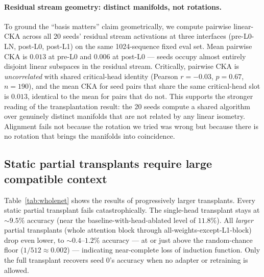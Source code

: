 \documentclass[final]{article}
\begin{document}
\paragraph{Residual stream geometry: distinct manifolds, not rotations.}
To ground the ``basis matters'' claim geometrically, we compute pairwise
linear-CKA across all 20 seeds' residual stream activations at three
interfaces (pre-L0-LN, post-L0, post-L1) on the same 1024-sequence fixed eval
set. Mean pairwise CKA is $0.013$ at pre-L0 and $0.006$ at post-L0 --- seeds
occupy almost entirely disjoint linear subspaces in the residual stream.
Critically, pairwise CKA is \emph{uncorrelated} with shared critical-head
identity (Pearson $r=-0.03$, $p=0.67$, $n=190$), and the mean CKA for seed
pairs that share the same critical-head slot is $0.013$, identical to the
mean for pairs that do not. This supports the stronger reading of the
transplantation result: the 20 seeds compute a shared algorithm over genuinely
distinct manifolds that are not related by any linear isometry. Alignment
fails not because the rotation we tried was wrong but because there is no
rotation that brings the manifolds into coincidence.

\subsection{Static partial transplants require large compatible context}

Table~\ref{tab:wholenet} shows the results of progressively larger transplants.
Every static partial transplant fails catastrophically. The single-head transplant
stays at ${\sim}9.5\%$ accuracy (near the baseline-with-head-ablated level of
$11.8\%$). All \emph{larger} partial transplants (whole attention block through
all-weights-except-L1-block) drop even lower, to ${\sim}0.4$--$1.2\%$ accuracy
--- at or just above the random-chance floor ($1/512 \approx 0.002$) ---
indicating near-complete loss of induction function. Only the full transplant
recovers seed 0's accuracy when no adapter or retraining is allowed.
\end{document}
